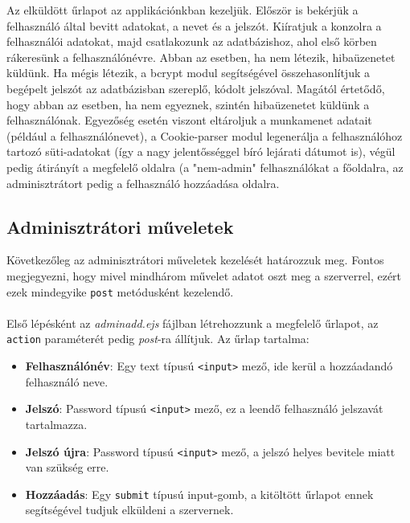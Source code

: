 Az elküldött űrlapot az applikációnkban kezeljük. Először is bekérjük a felhasználó által bevitt adatokat, a nevet és a jelszót. Kiíratjuk a konzolra a felhasználói adatokat, majd csatlakozunk az adatbázishoz, ahol első körben rákeresünk a felhasználónévre. Abban az esetben, ha nem létezik, hibaüzenetet küldünk. Ha mégis létezik, a bcrypt modul segítségével összehasonlítjuk a begépelt jelszót az adatbázisban szereplő, kódolt jelszóval. Magától értetődő, hogy abban az esetben, ha nem egyeznek, szintén hibaüzenetet küldünk a felhasználónak. Egyezőség esetén viszont eltároljuk a munkamenet adatait (például a felhasználónevet), a Cookie-parser modul legenerálja a felhasználóhoz tartozó süti-adatokat (így a nagy jelentősséggel bíró lejárati dátumot is), végül pedig átirányít a megfelelő oldalra (a "nem-admin" felhasználókat a főoldalra, az adminisztrátort pedig a felhasználó hozzáadása oldalra.


\subsection{Adminisztrátori műveletek}

Következőleg az adminisztrátori műveletek kezelését határozzuk meg. Fontos megjegyezni, hogy mivel mindhárom művelet adatot oszt meg a szerverrel, ezért ezek mindegyike \texttt{post} metódusként kezelendő.\\

\\

Első lépésként az \textit{adminadd.ejs} fájlban létrehozzunk a megfelelő űrlapot, az \texttt{action} paraméterét pedig \textit{post}-ra állítjuk. Az űrlap tartalma:

\begin{itemize}
\item{\textbf{Felhasználónév}: Egy text típusú \texttt{<input>} mező, ide kerül a hozzáadandó felhasználó neve.}
\item{\textbf{Jelszó}: Password típusú \texttt{<input>} mező, ez a leendő felhasználó jelszavát tartalmazza.}
\item{\textbf{Jelszó újra}: Password típusú \texttt{<input>} mező, a jelszó helyes bevitele miatt van szükség erre.}
\item{\textbf{Hozzáadás}: Egy \texttt{submit} típusú input-gomb, a kitöltött űrlapot ennek segítségével tudjuk elküldeni a szervernek.}
\end{itemize}

